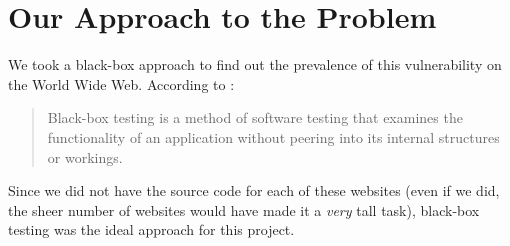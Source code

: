 \section[Approach]{Our Approach to the Problem}

We took a black-box approach to find out the prevalence of this vulnerability on the World Wide Web. According to \cite{wiki:Black-box_testing}:
\begin{quote}
	{Black-box testing is a method of software testing that examines the functionality of an application without peering into its internal structures or workings.}
\end{quote} 

Since we did not have the source code for each of these websites (even if we did, the sheer number of websites would have made it a \emph{very} tall task), black-box testing was the ideal approach for this project.